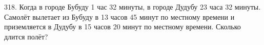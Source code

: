 318. Когда в городе Бубуду 1 час 32 минуты, в городе Дудубу 23 часа 32 минуты. Самолёт вылетает из Бубуду в 13 часов 45 минут по местному времени и приземляется в
Дудубу в 15 часов 20 минут по местному времени. Сколько длится полёт?\\
